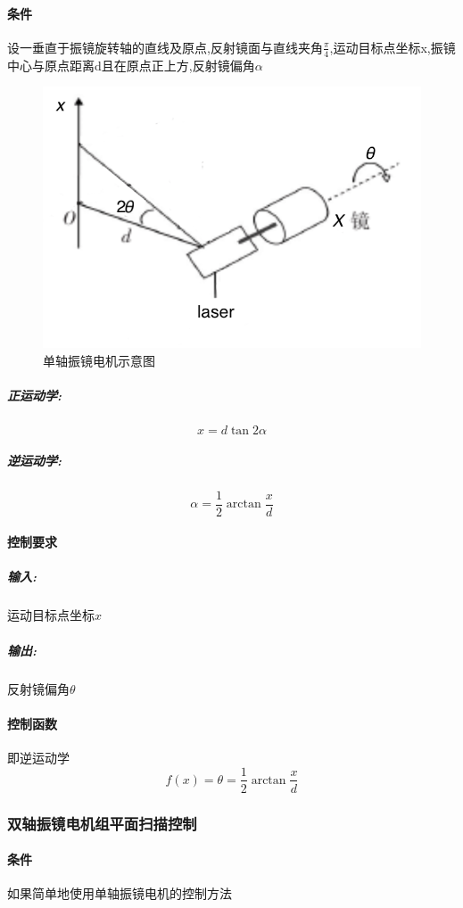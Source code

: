 \documentclass[a4paper,12pt,onecolumn,twoside]{article}
\begin{document}
\paragraph{条件}
设一垂直于振镜旋转轴的直线及原点,反射镜面与直线夹角$\frac{\pi}{4}$,运动目标点坐标x,振镜中心与原点距离d且在原点正上方,反射镜偏角$\alpha$
\begin{figure}[htbp]
\centering     
\includegraphics[width=\linewidth]{MG3.png}
\caption{单轴振镜电机示意图}
\end{figure}
\subparagraph{正运动学:}
\begin{equation}
x=d\tan2\alpha 
\end{equation}
\subparagraph{逆运动学:}
\begin{equation}
\alpha =\frac{1}{2}\arctan\frac{x}{d}
\end{equation}
\paragraph{控制要求}
\subparagraph{输入:}
运动目标点坐标$x$
\subparagraph{输出:}
反射镜偏角$\theta$
\paragraph{控制函数}即逆运动学
\begin{equation}
f(x)=\theta =\frac{1}{2} \arctan\frac{x}{d}
\end{equation}
\clearpage
\subsubsection{双轴振镜电机组平面扫描控制}

\paragraph{条件}
如果简单地使用单轴振镜电机的控制方法
\end{document}
